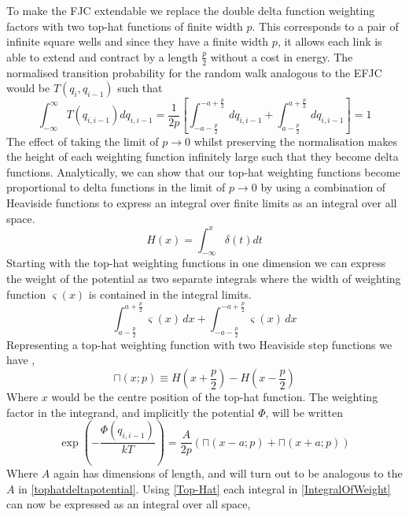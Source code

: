 To make the FJC extendable we replace the double delta function weighting factors with two top-hat functions of finite width $p$. This corresponds to a pair of infinite square wells and since they have a finite width $p$, it allows each link is able to extend and contract by a length $\frac{p}{2}$ without a cost in energy. The normalised transition probability for the random walk analogous to the EFJC would be $T\left(q_{i},q_{i-1}\right)$ such that
%
\begin{equation}
\int^{\infty}_{-\infty}T\left(q_{i,i-1}\right)dq_{i,i-1}=\frac{1}{2p}\left[\int_{-a-\frac{p}{2}}^{-a+\frac{p}{2}}\,dq_{i,i-1} + \int_{a-\frac{p}{2}}^{a+\frac{p}{2}}\,dq_{i,i-1}\right]=1
\end{equation} 
%
The effect of taking the limit of $p\rightarrow0$ whilst preserving the normalisation makes the height of each weighting function infinitely large such that they become delta functions. Analytically, we can show that our top-hat weighting functions become proportional to delta functions in the limit of $p\rightarrow0$ by using a combination of Heaviside functions to express an integral over finite limits as an integral over all space.
%
\begin{equation}
H(x)=\int_{-\infty}^{x}\delta(t)dt\label{HeavisideFunction}
\end{equation}
%
Starting with the top-hat weighting functions in one dimension we can express the weight of the potential as two separate integrals where the width of weighting function $\varsigma(x)$ is contained in the integral limits.
%
\begin{equation}
\int_{a-\frac{p}{2}}^{a+\frac{p}{2}}\varsigma(x)\, dx+\int_{-a-\frac{p}{2}}^{-a+\frac{p}{2}}\varsigma(x)\, dx\label{IntegralOfWeight}
\end{equation}
%
Representing a top-hat weighting function with two Heaviside step functions we have \cite{Bronshtein2007},
%
\begin{equation}
\sqcap\left(x;p\right)\equiv H\left(x+\frac{p}{2}\right)-H\left(x-\frac{p}{2}\right)\label{Top-Hat}
\end{equation}
%
Where $x$ would be the centre position of the top-hat function. The weighting factor in the integrand, and implicitly the potential $\Phi$, will be written 
%
\begin{equation}\label{tophatpotential}
\exp\left(-\frac{\Phi\left(q_{i,i-1}\right)}{kT}\right)= \frac{A}{2p}\left(\sqcap\left(x-a;p\right)+\sqcap\left(x+a;p\right)\right)
\end{equation}
%
Where $A$ again has dimensions of length, and will turn out to be analogous to the $A$ in \eqref{tophatdeltapotential}. Using \eqref{Top-Hat} each integral in \eqref{IntegralOfWeight} can now be expressed as an integral over all space,
